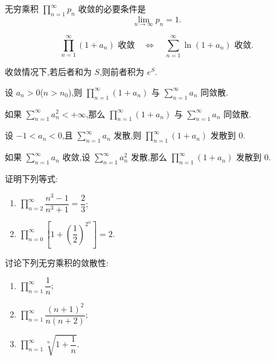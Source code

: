 \documentclass[../数学分析培优讲义.tex]{subfiles}
\begin{document}
\begin{theorem}[\markstar]
无穷乘积 $\displaystyle\prod\limits_{n=1}^{\infty}p_n$ 收敛的必要条件是
\[
    \lim\limits_{n\to\infty}p_n=1.
\]
\end{theorem}

\begin{theorem}[\markstar]
\[
    \prod\limits_{n=1}^{\infty}(1+a_n)\text{ 收敛}
    \quad\Longleftrightarrow\quad
    \sum\limits_{n=1}^{\infty}\ln(1+a_n)\text{ 收敛}.
\]
\end{theorem}

\begin{remark}
收敛情况下,若后者和为 $S$,则前者积为 $e^S$.
\end{remark}

\begin{theorem}[\markstar]
设 $a_n>0$($n>n_0$),则 $\displaystyle\prod\limits_{n=1}^{\infty}(1+a_n)$ 与 $\displaystyle\sum\limits_{n=1}^{\infty}a_n$ 同敛散.
\end{theorem}

\begin{theorem}[\markstar]
如果 $\displaystyle\sum\limits_{n=1}^{\infty}a_n^2<+\infty$,那么 $\displaystyle\prod\limits_{n=1}^{\infty}(1+a_n)$ 与 $\displaystyle\sum\limits_{n=1}^{\infty}a_n$ 同敛散.
\end{theorem}

\begin{theorem}
设 $-1<a_n<0$,且 $\displaystyle\sum\limits_{n=1}^{\infty}a_n$ 发散,则 $\displaystyle\prod\limits_{n=1}^{\infty}(1+a_n)$ 发散到 $0$.
\end{theorem}

\begin{theorem}
如果 $\displaystyle\sum\limits_{n=1}^{\infty}a_n$ 收敛,设 $\displaystyle\sum\limits_{n=1}^{\infty}a_n^2$ 发散,那么 $\displaystyle\prod\limits_{n=1}^{\infty}(1+a_n)$ 发散到 $0$.
\end{theorem}

\begin{example}
证明下列等式:
\begin{enumerate}[label=(\arabic*)]
    \item $\displaystyle\prod\limits_{n=2}^{\infty}\dfrac{n^3-1}{n^3+1}=\dfrac{2}{3}$;
    \item $\displaystyle\prod\limits_{n=0}^{\infty}\left[1+\left(\dfrac{1}{2}\right)^{2^n}\right]=2$.
\end{enumerate}
\end{example}
\exampleblank

\begin{example}
讨论下列无穷乘积的敛散性:
\begin{enumerate}[label=(\arabic*)]
    \item $\displaystyle\prod\limits_{n=1}^{\infty}\dfrac{1}{n}$;
    \item $\displaystyle\prod\limits_{n=1}^{\infty}\dfrac{(n+1)^2}{n(n+2)}$;
    \item $\displaystyle\prod\limits_{n=1}^{\infty}\sqrt[n]{1+\dfrac{1}{n}}$.
\end{enumerate}
\end{example}
\exampleblank
\end{document}
